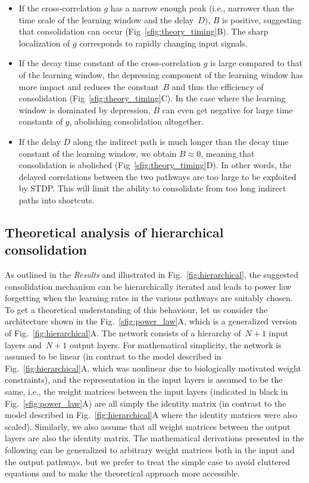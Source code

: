 \begin{itemize}
\item [(1)]
If the cross-correlation $g$ has a narrow enough peak (i.e., narrower than the time scale of the learning window and the delay~$D$), $B$ is positive, suggesting that consolidation can occur (Fig~\ref{sfig:theory_timing}B). The sharp localization of $g$ corresponds to rapidly changing input signals.

\item [(2)]
If the decay time constant of the cross-correlation $g$ is large compared to that of the learning window, the depressing component of the learning window has more impact and reduces the constant~$B$ and thus the efficiency of consolidation (Fig~\ref{sfig:theory_timing}C). In the case where the learning window is dominated by depression, $B$ can even get negative for large time constants of $g$, abolishing consolidation altogether.

\item [(3)]
If the delay $D$ along the indirect path is much longer than the decay time constant of the learning window, we obtain $B \approx 0$, meaning that consolidation is abolished (Fig~\ref{sfig:theory_timing}D). In other words, the delayed correlations between the two pathways are too large to be exploited by STDP. This will limit the ability to consolidate from too long indirect paths into shortcuts.
\end{itemize}


\subsection{Theoretical analysis of hierarchical consolidation}
\label{ssec:theory_hierarchy}

As outlined in the {\em Results} and illustrated in Fig.~\ref{fig:hierarchical}, the suggested consolidation mechanism can be hierarchically iterated and leads to power law forgetting when the learning rates in the various pathways are suitably chosen. To get a theoretical understanding of this behaviour, let us consider the architecture shown in the Fig.~\ref{sfig:power_law}A, which is a generalized version of Fig.~\ref{fig:hierarchical}A. The network consists of a hierarchy of~$N+1$ input layers and~$N+1$ output layers. For mathematical simplicity, the network is assumed to be linear (in  contrast to the model described in Fig.~\ref{fig:hierarchical}A, which was nonlinear due to biologically motivated weight constraints), and the representation in the input layers is assumed to be the same, i.e., the weight matrices between the input layers (indicated in black in Fig.~\ref{sfig:power_law}A) are all simply the identity matrix (in contrast to the model described in Fig.~\ref{fig:hierarchical}A where the identity matrices were also scaled). Similarly, we also assume that all weight matrices between the output layers are also the identity matrix. The mathematical derivations presented in the following can be generalized to arbitrary weight matrices both in the input and the output pathways, but we prefer to treat the simple case to avoid cluttered equations and to make the theoretical approach more accessible.

